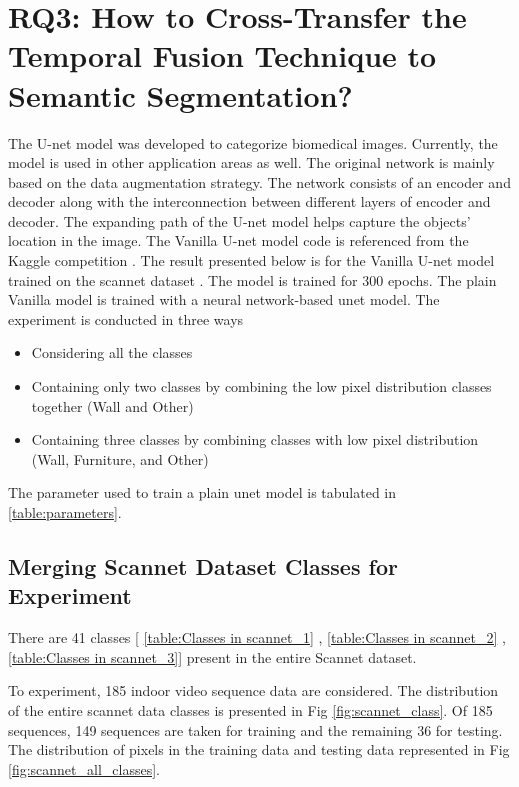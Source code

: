     \section{RQ3: How to Cross-Transfer the Temporal Fusion Technique to Semantic Segmentation?}
    
    The U-net model was developed to categorize biomedical images. Currently, the model is used in other application areas as well. The original network is mainly based on the data augmentation strategy. The network consists of an encoder and decoder along with the interconnection between different layers of encoder and decoder. The expanding path of the U-net model helps capture the objects' location in the image. The Vanilla U-net model code is referenced from the Kaggle competition \cite{85_kag_challenge}. The result presented below is for the Vanilla U-net model trained on the scannet dataset \cite{79_dai2017scannet}. The model is trained for 300 epochs. The plain Vanilla model is trained with a neural network-based unet model. The experiment is conducted in three ways
    \begin{itemize}
    	\item Considering all the classes
    	\item Containing only two classes by combining the low pixel distribution classes together (Wall and Other)
    	\item Containing three classes by combining classes with low pixel distribution (Wall, Furniture, and Other)
    \end{itemize}
    
    
    The parameter used to train a plain unet model is tabulated in \ref{table:parameters}.
    
    \subsection{Merging Scannet Dataset Classes for Experiment}
    
	There are 41 classes [ \ref{table:Classes in scannet_1} , \ref{table:Classes in scannet_2} , \ref{table:Classes in scannet_3}] present in the entire Scannet dataset. 

	To experiment, 185 indoor video sequence data are considered. The distribution of the entire scannet data classes is presented in Fig \ref{fig:scannet_class}. Of 185 sequences, 149 sequences are taken for training and the remaining 36 for testing. The distribution of pixels in the training data and testing data represented in Fig \ref{fig:scannet_all_classes}.
	

